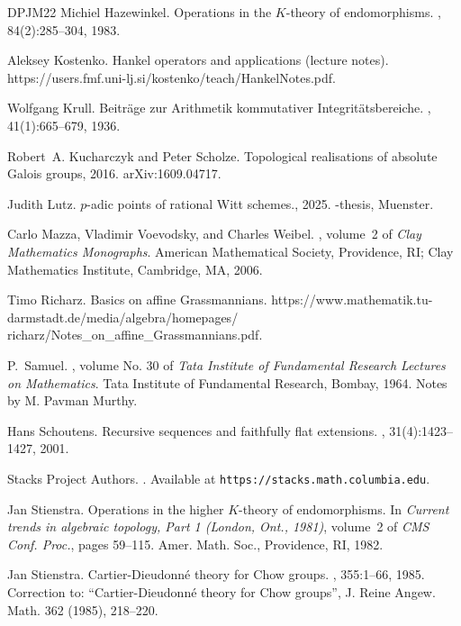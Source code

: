 \documentclass[12pt,leqno]{article}
\begin{document}
\begin{thebibliography}{DPJM22}
Michiel Hazewinkel.
\newblock Operations in the {$K$}-theory of endomorphisms.
, 84(2):285--304, 1983.

Aleksey Kostenko.
\newblock Hankel operators and applications (lecture notes).
\newblock https://users.fmf.uni-lj.si/kostenko/teach/HankelNotes.pdf.

Wolfgang Krull.
\newblock Beitr\"age zur {A}rithmetik kommutativer {I}ntegrit\"atsbereiche.
, 41(1):665--679, 1936.

Robert~A. Kucharczyk and Peter Scholze.
\newblock Topological realisations of absolute {G}alois groups, 2016.
\newblock arXiv:1609.04717.

Judith Lutz.
\newblock $p$-adic points of rational {W}itt schemes., 2025.
-thesis, {M}uenster.

Carlo Mazza, Vladimir Voevodsky, and Charles Weibel.
, volume~2 of {\em Clay
  Mathematics Monographs}.
\newblock American Mathematical Society, Providence, RI; Clay Mathematics
  Institute, Cambridge, MA, 2006.

Timo Richarz.
\newblock Basics on affine {G}rassmannians.
\newblock https://www.mathematik.tu-darmstadt.de/media/algebra/homepages/
  richarz/Notes\_on\_affine\_Grassmannians.pdf.

P.~Samuel.
, volume No. 30 of {\em
  Tata Institute of Fundamental Research Lectures on Mathematics}.
\newblock Tata Institute of Fundamental Research, Bombay, 1964.
\newblock Notes by M. Pavman Murthy.

Hans Schoutens.
\newblock Recursive sequences and faithfully flat extensions.
, 31(4):1423--1427, 2001.

{Stacks Project Authors}.
.
\newblock Available at {\tt https://stacks.math.columbia.edu}.

Jan Stienstra.
\newblock Operations in the higher {$K$}-theory of endomorphisms.
\newblock In {\em Current trends in algebraic topology, {P}art 1 ({L}ondon,
  {O}nt., 1981)}, volume~2 of {\em CMS Conf. Proc.}, pages 59--115. Amer. Math.
  Soc., Providence, RI, 1982.

Jan Stienstra.
\newblock Cartier-{D}ieudonn\'e{} theory for {C}how groups.
, 355:1--66, 1985.
\newblock Correction to: ``Cartier-{D}ieudonn\'e{} theory for {C}how groups'',
  {J}. {R}eine {A}ngew. {M}ath. 362 (1985), 218–220.


\end{thebibliography}
\end{document}
